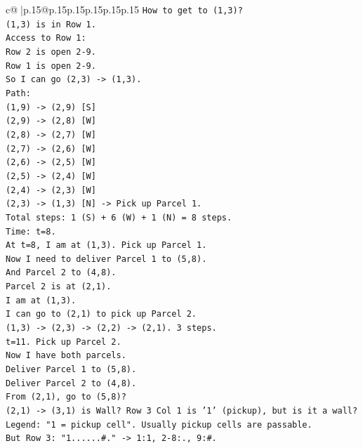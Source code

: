 \documentclass{article}
\begin{document}
{\begin{supertabular}{c@{$\;$}|p{.15\linewidth}@{}p{.15\linewidth}p{.15\linewidth}p{.15\linewidth}p{.15\linewidth}p{.15\linewidth}}
{{{\texttt{How to get to (1,3)?} \\
\texttt{(1,3) is in Row 1.} \\
\texttt{Access to Row 1:} \\
\texttt{Row 2 is open 2{-}9.} \\
\texttt{Row 1 is open 2{-}9.} \\
\texttt{So I can go (2,3) {-}> (1,3).} \\
\texttt{Path:} \\
\texttt{(1,9) {-}> (2,9) {[}S{]}} \\
\texttt{(2,9) {-}> (2,8) {[}W{]}} \\
\texttt{(2,8) {-}> (2,7) {[}W{]}} \\
\texttt{(2,7) {-}> (2,6) {[}W{]}} \\
\texttt{(2,6) {-}> (2,5) {[}W{]}} \\
\texttt{(2,5) {-}> (2,4) {[}W{]}} \\
\texttt{(2,4) {-}> (2,3) {[}W{]}} \\
\texttt{(2,3) {-}> (1,3) {[}N{]} {-}> Pick up Parcel 1.} \\
\texttt{Total steps: 1 (S) + 6 (W) + 1 (N) = 8 steps.} \\
\texttt{Time: t=8.} \\
\texttt{At t=8, I am at (1,3). Pick up Parcel 1.} \\
\texttt{Now I need to deliver Parcel 1 to (5,8).} \\
\texttt{And Parcel 2 to (4,8).} \\
\texttt{Parcel 2 is at (2,1).} \\
\texttt{I am at (1,3).} \\
\texttt{I can go to (2,1) to pick up Parcel 2.} \\
\texttt{(1,3) {-}> (2,3) {-}> (2,2) {-}> (2,1). 3 steps.} \\
\texttt{t=11. Pick up Parcel 2.} \\
\texttt{Now I have both parcels.} \\
\texttt{Deliver Parcel 1 to (5,8).} \\
\texttt{Deliver Parcel 2 to (4,8).} \\
\texttt{From (2,1), go to (5,8)?} \\
\texttt{(2,1) {-}> (3,1) is Wall? Row 3 Col 1 is '1' (pickup), but is it a wall?} \\
\texttt{Legend: "1 = pickup cell". Usually pickup cells are passable.} \\
\texttt{But Row 3: "1......\#." {-}> 1:1, 2{-}8:., 9:\#.} \\
}}}
\end{supertabular}}
\end{document}
